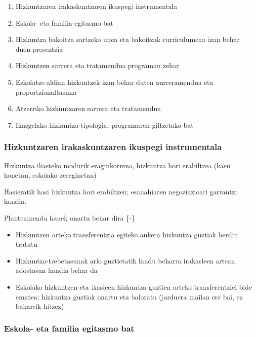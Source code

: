 \documentclass[
]{book}
\providecommand{\tightlist}{%
  \setlength{\itemsep}{0pt}\setlength{\parskip}{0pt}}
\begin{document}
\begin{enumerate}
\def\labelenumi{\arabic{enumi}.}
\tightlist
\item
  Hizkuntzaren irakaskuntzaren ikuspegi instrumentala
\item
  Eskola- eta familia-egitasmo bat
\item
  Hizkuntza bakoitza sartzeko unea eta bakoitzak curriculumean izan behar duen presentzia
\item
  Hizkuntzen sarrera eta tratamendua programan zehar
\item
  Eskolatze-aldian hizkuntzek izan behar duten aurreramendua eta proportzionaltasuna
\item
  Atzerriko hizkuntzaren sarrera eta tratamendua
\item
  Ikasgelako hizkuntza-tipologia, programaren giltzetako bat
\end{enumerate}

\hypertarget{hizkuntzaren-irakaskuntzaren-ikuspegi-instrumentala}{%
\subsubsection*{Hizkuntzaren irakaskuntzaren ikuspegi instrumentala}\label{hizkuntzaren-irakaskuntzaren-ikuspegi-instrumentala}}

Hizkuntza ikasteko modurik eraginkorrena, hizkuntza hori erabiltzea (kasu honetan, eskolako zereginetan)

Hasieratik hasi hizkuntza hori erabiltzen; esanahiaren negoziazioari garrantzi handia.

Planteamendu hauek onartu behar dira \{-\}

\begin{itemize}
\tightlist
\item
  Hizkuntzen arteko transferentzia egiteko aukera hizkuntza guztiak berdin tratatu
\item
  Hizkuntza-trebetasunak arlo guztietatik landu beharra irakasleen artean adostasun handia behar da
\item
  Eskolako hizkuntzen eta ikasleen hizkuntza guztien arteko transferentziei bide ematea; hizkuntza guztiak onartu eta baloratu (jarduera mailan ere bai, ez bakarrik hitzez)
\end{itemize}

\hypertarget{eskola--eta-familia-egitasmo-bat}{%
\subsubsection*{Eskola- eta familia egitasmo bat}\label{eskola--eta-familia-egitasmo-bat}}
\end{document}

